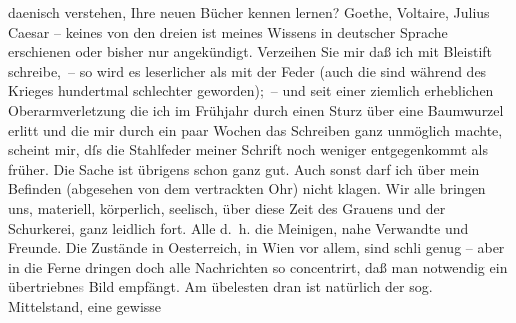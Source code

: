 \begin{ledgroupsized}[t]{13cm}
                    daenisch verstehen, Ihre neuen Bücher kennen lernen? Goethe, Voltaire, Julius Caesar – keines von den dreien ist meines Wissens in deutscher Sprache erschienen
                    oder bisher nur angekündigt.\pend
           \pstart
           Verzeihen Sie mir daß ich mit Bleistift schreibe, – so wird es leserlicher als
                    mit der Feder (auch die sind während des Krieges hundertmal schlechter
                    geworden); – und seit einer ziemlich erheblichen Oberarmverletzung die ich im
                    Frühjahr durch einen Sturz über eine Baumwurzel erlitt und die mir durch ein
                    paar Wochen das Schreiben ganz unmöglich machte, scheint mir, dſs die Stahlfeder
                    meiner Schrift noch weniger entgegenkommt als früher. Die Sache ist übrigens
                    schon ganz gut. Auch sonst darf ich über mein Befinden (abgesehen von dem
                    vertrackten Ohr) nicht klagen. Wir alle bringen uns, materiell, körperlich,
                    seelisch, über diese Zeit des Grauens und der Schurkerei, ganz leidlich fort.
                    Alle {\dotstwo} d. h. die {\pb}Meinigen, nahe Verwandte und Freunde. Die Zustände in Oesterreich, in Wien vor
                    allem, sind schli{\geminationm} genug – aber in die Ferne
                    dringen doch alle Nachrichten so concentrirt, daß man notwendig ein
                        übertriebne\textcolor{gray}{s} Bild empfängt. Am übelesten \introOben{}dran\introOben{} ist natürlich der sog. Mittelstand, eine gewisse

\end{ledgroupsized}

